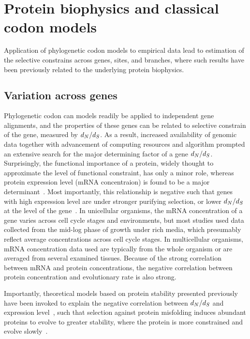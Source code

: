 \section{Protein biophysics and classical codon models}

Application of phylogenetic codon models to empirical data lead to estimation of the selective constrains across genes, sites, and branches, where such results have been previously related to the underlying protein biophysics.

\subsection{Variation across genes}

Phylogenetic codon can models readily be applied to independent gene alignments, and the properties of these genes can be related to selective constrain of the gene, measured by $d_N / d_S$.
As a result, increased availability of genomic data together with advancement of computing resources and algorithm prompted an extensive search for the major determining factor of a gene $d_N / d_S$.
Surprisingly, the functional importance of a protein, widely thought to approximate the level of functional constraint, has only a minor role, whereas protein expression level (mRNA concentraion) is found to be a major determinant~\citep{Zhang2015}.
Most importantly, this relationship is negative such that genes with high expression level are under stronger purifying selection, or lower $d_N / d_S$ at the level of the gene~\citep{Duret2000, Drummond2005a, Zhang2015}.
In unicellular organisms, the mRNA concentration of a gene varies across cell cycle stages and environments, but most studies used data collected from the mid-log phase of growth under rich media, which presumably reflect average concentrations across cell cycle stages.
In multicellular organisms, mRNA concentration data used are typically from the whole organism or are averaged from several examined tissues.
Because of the strong correlation between mRNA and protein concentrations, the negative correlation between protein concentration and evolutionary rate is also strong.

Importantly, theoretical models based on protein stability presented previously have been invoked to explain the negative correlation between $d_N / d_S$ and expression level~\citep{Wilke2006, Drummond2008}, such that selection against protein misfolding induces abundant proteins to evolve to greater stability, where the protein is more constrained and evolve slowly~\citep{Serohijos2012}.

